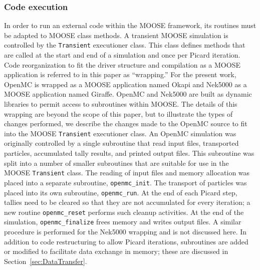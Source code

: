 \documentclass[letterpaper]{physor2018}
\begin{document}
\subsubsection{Code execution}
In order to run an external code within the MOOSE framework, its routines must
be adapted to MOOSE class methods. A transient MOOSE simulation is controlled
by the {\tt Transient} executioner class. This class defines methods that are called at the
start and end of a simulation and once per Picard iteration.
Code reorganization to fit the driver structure and compilation as a MOOSE application
is referred to in this paper as ``wrapping.''
For the present work, OpenMC is wrapped as a MOOSE application named Okapi
and Nek5000 as a MOOSE application named Giraffe.
OpenMC and Nek5000 are built as dynamic libraries to permit access
to subroutines within MOOSE.
The details of this wrapping are beyond the scope of this paper, but to illustrate the
types of changes performed, we describe the changes made to the OpenMC source to fit
into the MOOSE {\tt Transient} executioner class.
An OpenMC simulation was originally controlled by a single subroutine
that read input files, transported particles, accumulated tally results,
and printed output files. This subroutine was split into a number of smaller subroutines that
are suitable for use in the MOOSE {\tt Transient} class.
The reading of input files and memory allocation was
placed into a separate subroutine, {\tt openmc\_init}.
The transport of particles was placed into its own subroutine, {\tt openmc\_run}.
At the end of each Picard step, tallies need to be cleared so that they are not accumulated
for every iteration; a new routine {\tt openmc\_reset} performs
such cleanup activities.
At the end of the simulation, {\tt openmc\_finalize} frees memory and writes output files.
A similar procedure is performed for the Nek5000 wrapping and is not discussed here.
In addition to code restructuring to allow Picard iterations, subroutines are added or
modified to facilitate data exchange in memory; these are discussed in Section~\ref{sec:DataTransfer}.
\end{document}
